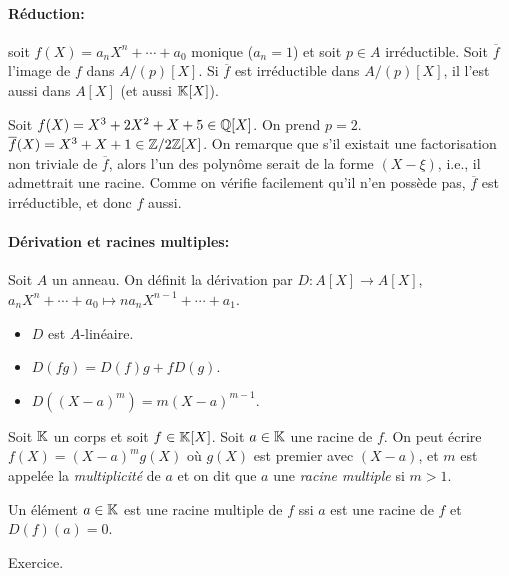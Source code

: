 \paragraph{Réduction:}

soit $f(X) = a_n X^n + \cdots + a_0$ monique ($a_n = 1$) et soit $p \in A$ irréductible. Soit $\overline{f}$
l'image de $f$ dans $A/(p)[X]$. Si $\overline{f}$ est irréductible dans $A/(p)[X]$, il l'est aussi dans $A[X]$
(et aussi $\mathbb{K}[X]$).

\begin{ex}
  Soit $f(X) = X^3 + 2X^2 + X + 5 \in \mathbb{Q}[X]$. On prend $p = 2$. $\overline{f}(X) = X^3 + X + 1 \in
  \mathbb{Z}/2\mathbb{Z}[X]$. On remarque que s'il existait une factorisation non triviale de $\overline{f}$, alors l'un des
  polynôme serait de la forme $(X - \xi)$, i.e., il admettrait une racine. Comme on vérifie facilement qu'il
  n'en possède pas, $\overline{f}$ est irréductible, et donc $f$ aussi.
\end{ex}

\paragraph{Dérivation et racines multiples:}

Soit $A$ un anneau. On définit la dérivation par $D: A[X] \to A[X]$, $a_nX^n + \cdots + a_0 \mapsto
na_nX^{n-1} + \cdots + a_1$.
\begin{itemize}
\item $D$ est $A$-linéaire.
\item $D(fg) = D(f)g + fD(g)$.
\item $D((X-a)^m) = m(X-a)^{m-1}$.
\end{itemize}

\begin{defi}
  Soit $\mathbb{K}$ un corps et soit $f \in \mathbb{K}[X]$. Soit $a \in \mathbb{K}$ une racine de $f$. On peut écrire $f(X) =
  (X-a)^{m}g(X)$ où $g(X)$ est premier avec $(X-a)$, et $m$ est appelée la \emph{multiplicité} de $a$ et on
  dit que $a$ une \emph{racine multiple} si $m > 1$.
\end{defi}

\begin{prop}
  Un élément $a \in \mathbb{K}$ est une racine multiple de $f$ ssi $a$ est une racine de $f$ et $D(f)(a) = 0$.
\end{prop}

\begin{preuve}
  Exercice.
\end{preuve}



